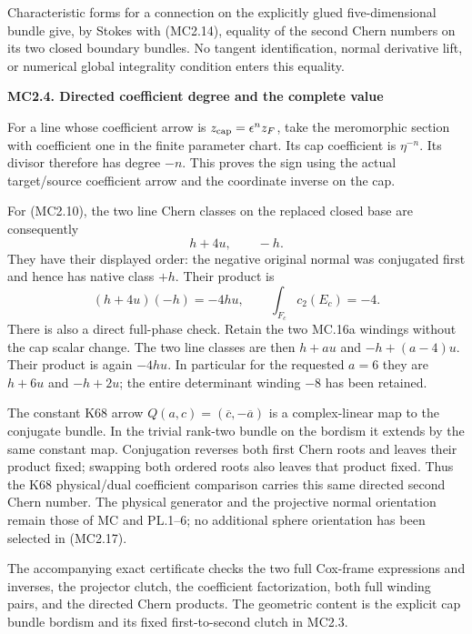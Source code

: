 Characteristic forms for a connection on the explicitly glued
five-dimensional bundle give, by Stokes with (MC2.14), equality
of the second Chern numbers on its two closed boundary bundles.
No tangent identification, normal derivative lift, or numerical
global integrality condition enters this equality.

\par

\medskip\noindent\textbf{MC2.4. Directed coefficient degree and the complete value}

\par\nobreak

For a line whose coefficient arrow is
\(z_{\rm cap}=\epsilon^n z_F\), take the meromorphic section with
coefficient one in the finite parameter chart. Its cap coefficient
is \(\eta^{-n}\). Its divisor therefore has degree \(-n\).
This proves the sign using the actual target/source coefficient
arrow and the coordinate inverse on the cap.

For (MC2.10), the two line Chern classes on the replaced closed
base are consequently
\[
                 h+4u,\qquad -h.
                                                               \tag{MC2.16}
\]
They have their displayed order: the negative original normal
was conjugated first and hence has native class \(+h\). Their
product is
\[
 (h+4u)(-h)=-4hu,\qquad
                    \int_{F_c}c_2(E_c)=-4.             \tag{MC2.17}
\]
There is also a direct full-phase check. Retain the two MC.16a
windings without the cap scalar change. The two line classes
are then \(h+au\) and \(-h+(a-4)u\). Their product is again
\(-4hu\). In particular for the requested \(a=6\) they are
\(h+6u\) and \(-h+2u\); the entire determinant winding \(-8\)
has been retained.

The constant K68 arrow \(Q(a,c)=(\overline c,-\overline a)\)
is a complex-linear map to the conjugate bundle. In the trivial
rank-two bundle on the bordism it extends by the same constant
map. Conjugation reverses both first Chern roots and leaves
their product fixed; swapping both ordered roots also leaves
that product fixed. Thus the K68 physical/dual coefficient
comparison carries this same directed second Chern number.
The physical generator and the projective normal orientation
remain those of MC and PL.1--6; no additional sphere orientation
has been selected in (MC2.17).

The accompanying exact certificate checks the two full Cox-frame
expressions and inverses, the projector clutch, the coefficient
factorization, both full winding pairs, and the directed Chern
products. The geometric content is the explicit cap bundle
bordism and its fixed first-to-second clutch in MC2.3.

